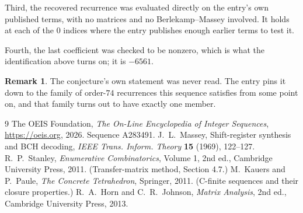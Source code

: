 \documentclass[11pt,a4paper]{article}
\theoremstyle{plain}
\theoremstyle{definition}
\newtheorem{remark}[theorem]{Remark}
\begin{document}
Third, the recovered recurrence was evaluated directly on the entry's own published terms, with
no matrices and no Berlekamp--Massey involved. It holds at each of the $0$ indices where
the entry publishes enough earlier terms to test it.

Fourth, the last coefficient was checked to be nonzero, which is what the identification above
turns on; it is $-6561$.

\begin{remark}
The conjecture's own statement was never read. The entry pins it down to the family of
order-$74$ recurrences this sequence satisfies from some point on, and that family turns
out to have exactly one member.
\end{remark}

\begin{thebibliography}{9}
 The OEIS Foundation, \emph{The On-Line Encyclopedia of Integer
Sequences}, \url{https://oeis.org}, 2026. Sequence A283491.
 J.~L.~Massey, Shift-register synthesis and BCH decoding, \emph{IEEE
Trans. Inform. Theory} \textbf{15} (1969), 122--127.
 R.~P.~Stanley, \emph{Enumerative Combinatorics}, Volume 1, 2nd ed.,
Cambridge University Press, 2011. (Transfer-matrix method, Section 4.7.)
 M.~Kauers and P.~Paule, \emph{The Concrete Tetrahedron}, Springer, 2011.
(C-finite sequences and their closure properties.)
 R.~A.~Horn and C.~R.~Johnson, \emph{Matrix Analysis}, 2nd ed., Cambridge
University Press, 2013.
\end{thebibliography}
\end{document}
